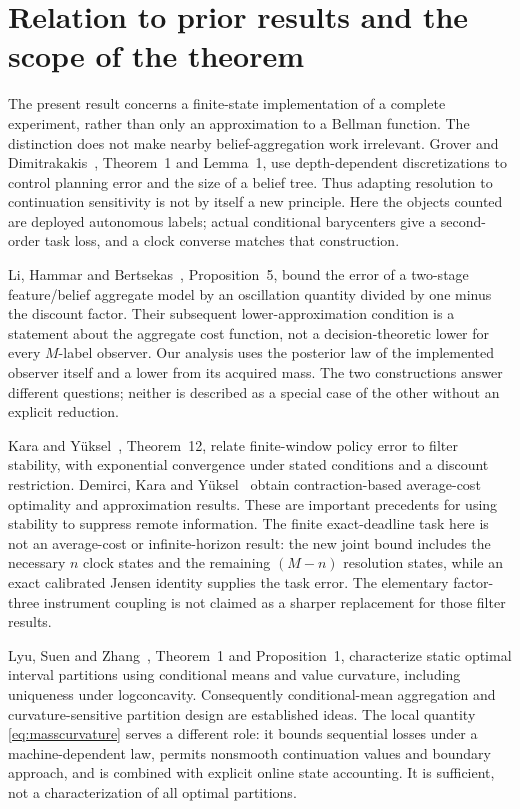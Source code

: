 \section{Relation to prior results and the scope of the theorem}\label{sec:comparison}
The present result concerns a finite-state implementation of a complete experiment, rather than only an approximation to a Bellman function. The distinction does not make nearby belief-aggregation work irrelevant. Grover and Dimitrakakis~\cite{grover}, Theorem~1 and Lemma~1, use depth-dependent discretizations to control planning error and the size of a belief tree. Thus adapting resolution to continuation sensitivity is not by itself a new principle. Here the objects counted are deployed autonomous labels; actual conditional barycenters give a second-order task loss, and a clock converse matches that construction.

Li, Hammar and Bertsekas~\cite{li}, Proposition~5, bound the error of a two-stage feature/belief aggregate model by an oscillation quantity divided by one minus the discount factor. Their subsequent lower-approximation condition is a statement about the aggregate cost function, not a decision-theoretic lower for every $M$-label observer. Our analysis uses the posterior law of the implemented observer itself and a lower from its acquired mass. The two constructions answer different questions; neither is described as a special case of the other without an explicit reduction.

Kara and Y\"uksel~\cite{kara}, Theorem~12, relate finite-window policy error to filter stability, with exponential convergence under stated conditions and a discount restriction. Demirci, Kara and Y\"uksel~\cite{demirci} obtain contraction-based average-cost optimality and approximation results. These are important precedents for using stability to suppress remote information. The finite exact-deadline task here is not an average-cost or infinite-horizon result: the new joint bound includes the necessary $n$ clock states and the remaining $(M-n)$ resolution states, while an exact calibrated Jensen identity supplies the task error. The elementary factor-three instrument coupling is not claimed as a sharper replacement for those filter results.

Lyu, Suen and Zhang~\cite{lyu}, Theorem~1 and Proposition~1, characterize static optimal interval partitions using conditional means and value curvature, including uniqueness under logconcavity. Consequently conditional-mean aggregation and curvature-sensitive partition design are established ideas. The local quantity \eqref{eq:masscurvature} serves a different role: it bounds sequential losses under a machine-dependent law, permits nonsmooth continuation values and boundary approach, and is combined with explicit online state accounting. It is sufficient, not a characterization of all optimal partitions.

